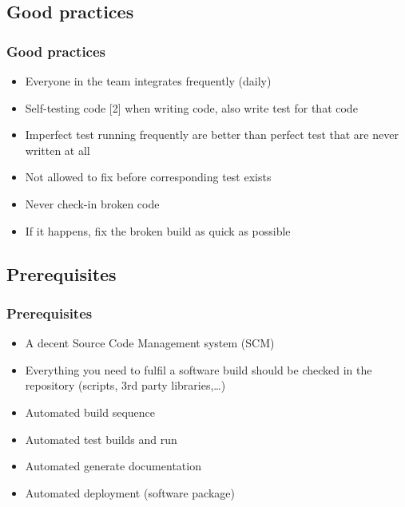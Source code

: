 \documentclass{beamer}
\begin{document}
\subsection[Good practices]{Good practices}
\begin{frame}
\frametitle{Good practices}
\begin{itemize}
  \item<1-> Everyone in the team integrates frequently (daily)\cite{Fowler06}
  \item<2-> Self-testing code [2] when writing code, also write test for
  that code\cite{Duvall07}
  \item<3-> Imperfect test running frequently are better than perfect test that
  are never written at all\cite{Duvall07}
  \item<4-> Not allowed to fix before corresponding test exists
  \item<5-> Never check-in broken code\cite{Berczuk03} 
  \item<6-> If it happens, fix the broken build as quick as possible 
\end{itemize}
\end{frame}


\subsection[Prerequisites]{Prerequisites}

\begin{frame}
\frametitle{Prerequisites}

\begin{itemize}
  \item<1-> A decent Source Code Management system (SCM)\cite{Berczuk03}
  \item<2-> Everything you need to fulfil a software build should be checked in
  the repository\cite{Berczuk03} (scripts, 3rd party libraries,\ldots)
  \item<3-> Automated build sequence
  \item<4-> Automated test builds and run
  \item<5-> Automated generate documentation
  \item<6-> Automated deployment (software package)  
\end{itemize}

\end{frame}
\end{document}
